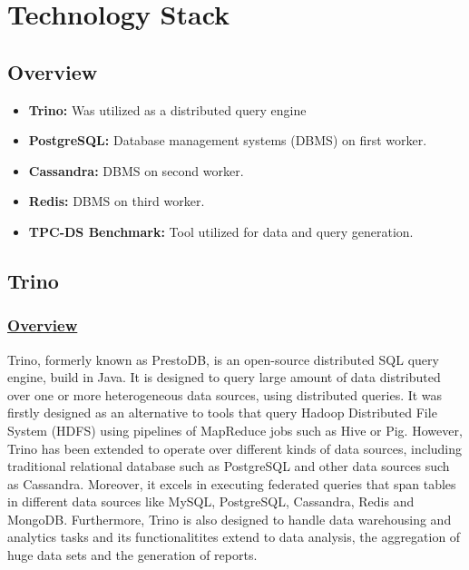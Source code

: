 \documentclass[conference]{IEEEtran}
\begin{document}
\section{Technology Stack}

\subsection{Overview}

\begin{itemize}
    \item \textbf{Trino:} Was utilized as a distributed query engine
    \item \textbf{PostgreSQL:} Database management systems (DBMS) on first worker.
    \item \textbf{Cassandra:} DBMS on second worker.
    \item \textbf{Redis:} DBMS on third worker.
    \item \textbf{TPC-DS Benchmark:} Tool utilized for data and query generation.
\end{itemize}

\subsection{Trino}

\subsubsection{\textbf{\underline{Overview}}}
Trino, formerly known as PrestoDB, is an open-source distributed SQL query engine, build in Java. It is designed to query large amount of data
distributed over one or more heterogeneous data sources, using distributed queries. It was firstly designed as an alternative to tools that query
Hadoop Distributed File System (HDFS) using pipelines of MapReduce jobs such as Hive or Pig. However, Trino has been extended to operate over different
kinds of data sources, including traditional relational database such as PostgreSQL and other data sources such as Cassandra. Moreover, it excels in
executing federated queries that span tables in different data sources like MySQL, PostgreSQL, Cassandra, Redis and MongoDB. Furthermore, Trino is
also designed to handle data warehousing and analytics tasks and its functionalitites extend to data analysis, the aggregation of huge data sets and the generation of reports.
\end{document}
